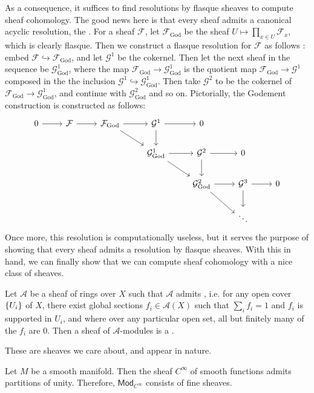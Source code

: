 %
As a consequence, it suffices to find resolutions by flasque sheaves to compute sheaf
cohomology. The good news here is that every sheaf admits a canonical
acyclic resolution, the . For a sheaf $\mathcal{F}$,
let $\mathcal{F}_{\mathrm{God}}$ be the sheaf $U \mapsto \prod_{x \in U}\mathcal{F}_x$,
which is clearly flasque. Then we construct a flasque resolution for
$\mathcal{F}$ as follows : embed
$\mathcal{F} \hookrightarrow \mathcal{F}_{\mathrm{God}}$, and let $\mathcal{G}^1$ be
the cokernel. Then let the next sheaf in the sequence be $\mathcal{G}^1_{\mathrm{God}}$,
where the map $\mathcal{F}_{\mathrm{God}} \to \mathcal{G}^1_{\mathrm{God}}$ is the
quotient map $\mathcal{F}_{\mathrm{God}} \to \mathcal{G}^1$ composed in the the inclusion
$\mathcal{G}^1 \hookrightarrow \mathcal{G}^1_{\mathrm{God}}$. Then take $\mathcal{G}^2$
to be the cokernel of $\mathcal{F}_{\mathrm{God}} \to \mathcal{G}^1_{\mathrm{God}}$,
and continue with $\mathcal{G}^2_{\mathrm{God}}$ and so on. Pictorially, the
Godement construction is constructed as follows:
\[\begin{tikzcd}
0 \ar[r] & \mathcal{F} \ar[r] & \mathcal{F}_{\mathrm{God}} \ar[dr] \ar[r]
& \mathcal{G}^1 \ar[r] \ar[d] & 0 \\
& & & \mathcal{G}^1_{\mathrm{God}} \ar[r] \ar[dr] & \mathcal{G}^2 \ar[r] \ar[d] & 0\\
& & & & \mathcal{G}^2_{\mathrm{God}} \ar[r] \ar[dr] & \mathcal{G}^3 \ar[r] \ar[d] & 0 \\
& & & & & \ddots
\end{tikzcd}\]
%
Once more, this resolution is computationally useless, but it serves the purpose of
showing that every sheaf admits a resolution by flasque sheaves. With this in hand,
we can finally show that we can compute sheaf cohomology with a nice class of sheaves.
%
\begin{defn}
Let $\mathcal{A}$ be a sheaf of rings over $X$ such that $\mathcal{A}$ admits
, i.e. for any open cover $\left\lbrace U_i \right\rbrace$ of $X$, there exist global
sections $f_i \in \mathcal{A}(X)$ such that $\sum_i f_i = 1$ and $f_i$ is supported
in $U_i$, and where over any particular open set, all but finitely many of the $f_i$
are $0$. Then a sheaf of $\mathcal{A}$-modules is a .
\end{defn}
%
These are sheaves we care about, and appear in nature.
%
\begin{exmp}
Let $M$ be a smooth manifold. Then the sheaf $C^\infty$ of smooth functions
admits partitions of unity. Therefore, $\mathsf{Mod}_{C^\infty}$ consists of fine
sheaves.
\end{exmp}
